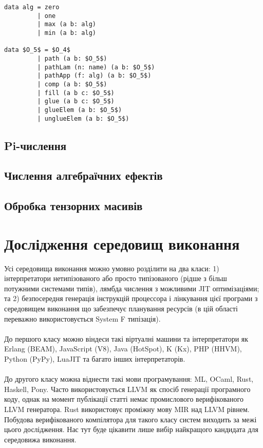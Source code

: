 \begin{lstlisting}[mathescape=true]
data alg = zero
         | one
         | max (a b: alg)
         | min (a b: alg)

data $O_5$ = $O_4$
         | path (a b: $O_5$)
         | pathLam (n: name) (a b: $O_5$)
         | pathApp (f: alg) (a b: $O_5$)
         | comp (a b: $O_5$)
         | fill (a b c: $O_5$)
         | glue (a b c: $O_5$)
         | glueElem (a b: $O_5$)
         | unglueElem (a b: $O_5$)
\end{lstlisting}

\subsection{Pi-числення}

\subsection{Числення алгебраїчних ефектів}

\subsection{Обробка тензорних масивів}

\newpage
\section{Дослідження середовищ виконання}

Усі середовища виконання можно умовно розділити на два класи:
1) інтерпретатори нетипізованого або просто
типізованого (рідше з більш потужними системами типів),
лямбда числення з можливими JIT оптимізаціями; та 2)
безпосередня генерація інструкцій процессора і лінкування цієї програми з
середовищем виконання що забезпечує планування ресурсів
(в цій області переважно використовується System F типізація).

\paragraph{}
До першого класу можно віндеси такі віртуалні машини та інтерпретатори як
Erlang (BEAM), JavaScript (V8), Java (HotSpot), K (Kx), PHP (HHVM), Python (PyPy), LuaJIT
та багато інших інтерпретаторів.

\paragraph{}
До другого класу можна віднести такі мови програмування: ML, OCaml, Rust,
Haskell, Pony. Часто використовується LLVM як спосіб генерації програмного коду,
однак на момент публікації статті немає промислового верифікованого LLVM генератора.
Rust використовує проміжну мову MIR над LLVM рівнем. Побудова верифікованого компілятора
для такого класу систем виходить за межі цього дослідження. Нас тут буде цікавити
лише вибір найкращого кандидата для середовижа виконання.

